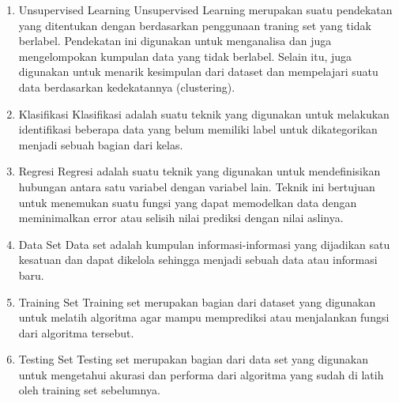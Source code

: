 \begin{enumerate}
\begin{enumerate}
		\item Unsupervised Learning
		\newline Unsupervised Learning merupakan suatu pendekatan yang ditentukan dengan berdasarkan penggunaan traning set yang tidak berlabel. Pendekatan ini digunakan untuk menganalisa dan juga mengelompokan kumpulan data yang tidak berlabel. Selain itu, juga digunakan untuk menarik kesimpulan dari dataset dan mempelajari suatu data berdasarkan kedekatannya (clustering).
		
		\item Klasifikasi
		\newline Klasifikasi adalah suatu teknik yang digunakan untuk melakukan identifikasi beberapa data yang belum memiliki label untuk dikategorikan menjadi sebuah bagian dari kelas. 
		
		\item Regresi
		\newline Regresi adalah suatu teknik yang digunakan untuk mendefinisikan hubungan antara satu variabel dengan variabel lain. Teknik ini bertujuan untuk menemukan suatu fungsi yang dapat memodelkan data dengan meminimalkan error atau selisih nilai prediksi dengan nilai aslinya.
		
		\item Data Set
		\newline Data set adalah kumpulan informasi-informasi yang dijadikan satu kesatuan dan dapat dikelola sehingga menjadi sebuah data atau informasi baru. 
		
		\item Training Set
		\newline Training set merupakan bagian dari dataset yang digunakan untuk melatih algoritma agar mampu memprediksi atau menjalankan fungsi dari algoritma tersebut.
		
		\item Testing Set
		\newline Testing set merupakan bagian dari data set yang digunakan untuk mengetahui akurasi dan performa dari algoritma yang sudah di latih oleh training set sebelumnya.
		 
	\end{enumerate}
\end{enumerate}

\newpage
